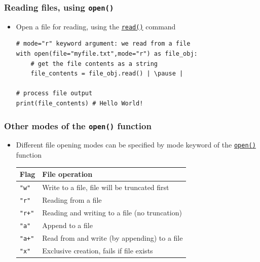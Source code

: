 \documentclass[xcolor=table]{beamer}
\begin{document}
\begin{frame}[fragile]
    \frametitle{Reading files, using \texttt{open()}}
\begin{itemize}
    \item Open a file for reading, using the \href{https://docs.python.org/3/library/io.html#io.TextIOBase.read}{\texttt{read()}} command \pause
\begin{lstlisting}[style=python]
# mode="r" keyword argument: we read from a file
with open(file="myfile.txt",mode="r") as file_obj:
    # get the file contents as a string
    file_contents = file_obj.read() | \pause |

# process file output
print(file_contents) # Hello World!
\end{lstlisting}
\end{itemize}
\end{frame}

\begin{frame}[fragile]
    \frametitle{Other modes of the \texttt{open()} function}
\begin{itemize}
    \item Different file opening modes can be specified by mode keyword of the \href{https://docs.python.org/3/library/functions.html#open}{\texttt{open()}} function \pause 
\begin{center}
    \begin{tabular}{|l|l|}\hline
        Flag & File operation \\ \hline
        \texttt{"w"}
    & Write to a file, file will be truncated first \\
        \texttt{"r"} & Reading from a file \\
        \texttt{"r+"} & Reading and writing to a file (no truncation) \\
        \texttt{"a"} & Append to a file \\
        \texttt{"a+"} & Read from and write (by appending) to a file \\
        \texttt{"x"} & Exclusive creation, fails if file exists \\ \hline
    \end{tabular}
\end{center}
\end{itemize}
\end{frame}
\end{document}

